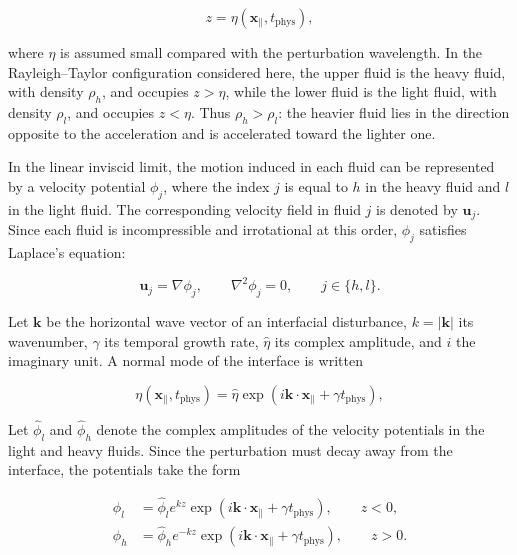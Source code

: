 \begin{equation}
z=\eta(\mathbf{x}_{\parallel},t_{\mathrm{phys}}),
\end{equation}

where $\eta$ is assumed small compared with the perturbation wavelength. In the Rayleigh--Taylor configuration considered here, the upper fluid is the heavy fluid, with density $\rho_h$, and occupies $z>\eta$, while the lower fluid is the light fluid, with density $\rho_l$, and occupies $z<\eta$. Thus $\rho_h>\rho_l$: the heavier fluid lies in the direction opposite to the acceleration and is accelerated toward the lighter one.

In the linear inviscid limit, the motion induced in each fluid can be represented by a velocity potential $\phi_j$, where the index $j$ is equal to $h$ in the heavy fluid and $l$ in the light fluid. The corresponding velocity field in fluid $j$ is denoted by $\mathbf{u}_j$. Since each fluid is incompressible and irrotational at this order, $\phi_j$ satisfies Laplace's equation:

\begin{equation}
\mathbf{u}_j=\nabla \phi_j,
\qquad
\nabla^2\phi_j=0,
\qquad
j\in\{h,l\}.
\end{equation}

Let $\mathbf{k}$ be the horizontal wave vector of an interfacial disturbance, $k=|\mathbf{k}|$ its wavenumber, $\gamma$ its temporal growth rate, $\hat{\eta}$ its complex amplitude, and $i$ the imaginary unit. A normal mode of the interface is written

\begin{equation}
\eta(\mathbf{x}_{\parallel},t_{\mathrm{phys}})
=
\hat{\eta}
\exp\left(i\mathbf{k}\cdot\mathbf{x}_{\parallel}+\gamma t_{\mathrm{phys}}\right),
\end{equation}

Let $\hat{\phi}_l$ and $\hat{\phi}_h$ denote the complex amplitudes of the velocity potentials in the light and heavy fluids. Since the perturbation must decay away from the interface, the potentials take the form

\begin{align}
\phi_l &=
\hat{\phi}_l
e^{kz}
\exp\left(i\mathbf{k}\cdot\mathbf{x}_{\parallel}+\gamma t_{\mathrm{phys}}\right),
\qquad z<0,\\
\phi_h &=
\hat{\phi}_h
e^{-kz}
\exp\left(i\mathbf{k}\cdot\mathbf{x}_{\parallel}+\gamma t_{\mathrm{phys}}\right),
\qquad z>0.
\end{align}

